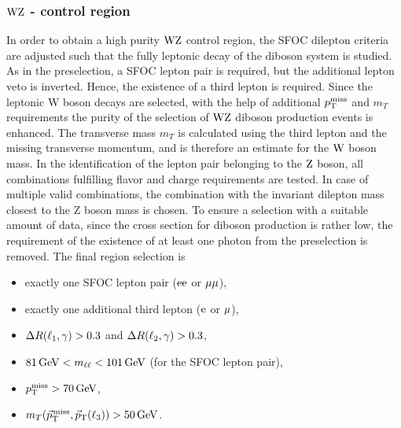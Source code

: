 \subsubsection*{$\mathrm{W}\mathrm{Z}$ - control region}
In order to obtain a high purity $\mathrm{W}\mathrm{Z}$ control region, the SFOC dilepton criteria are adjusted such that the fully leptonic decay of the diboson system is studied. As in the preselection, a SFOC lepton pair is required, but the additional lepton veto is inverted. Hence, the existence of a third lepton is required. Since the leptonic W boson decays are selected, with the help of additional $p_{\mathrm{T}}^\text{miss}$ and $m_{T}$ requirements the purity of the selection of $\mathrm{W}\mathrm{Z}$ diboson production events is enhanced. The transverse mass $m_{T}$ is calculated using the third lepton and the missing transverse momentum, and is therefore an estimate for the $\mathrm{W}$ boson mass. In the identification of the lepton pair belonging to the $\mathrm{Z}$ boson, all combinations fulfilling flavor and charge requirements are tested. In case of multiple valid combinations, the combination with the invariant dilepton mass closest to the Z boson mass is chosen. To ensure a selection with a suitable amount of data, since the cross section for diboson production is rather low, the requirement of the existence of at least one photon from the preselection is removed. The final region selection is
\begin{itemize}
 \item exactly one SFOC lepton pair ($\mathrm{e}\mathrm{e}$ or $\mu\mu$),
 \item exactly one additional third lepton ($\mathrm{e}$ or ${\mu}$),
 \item $\Delta R(\ell_1,\gamma)>0.3$ and $\Delta R(\ell_2,\gamma)>0.3$,
 \item $81\,\text{Ge\hspace{-.08em}V}<m_{\ell\ell}<101\,\text{Ge\hspace{-.08em}V}$ (for the SFOC lepton pair),
 \item $p_{\mathrm{T}}^\text{miss}>70\,\text{Ge\hspace{-.08em}V}$,
 \item $m_{T}({\vec p}_{\mathrm{T}}^{\kern1pt\text{miss}},{\vec p}_{\mathrm{T}}(\ell_3))>50\,\text{Ge\hspace{-.08em}V}$.
\end{itemize}
